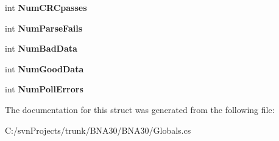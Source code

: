 \begin{DoxyCompactItemize}
\mbox{\label{struct_b_n_a30_1_1_globals2_1_1_polling_stats_aafa0cdda40a8d75c8e2d1b6c0eb58403}} 
int {\bfseries Num\+C\+R\+Cpasses}
\item 
\mbox{\label{struct_b_n_a30_1_1_globals2_1_1_polling_stats_aa584fd8596800896b1934f70bc23167b}} 
int {\bfseries Num\+Parse\+Fails}
\item 
\mbox{\label{struct_b_n_a30_1_1_globals2_1_1_polling_stats_aac4b1091cf97ba96d93d1aa740eb37ca}} 
int {\bfseries Num\+Bad\+Data}
\item 
\mbox{\label{struct_b_n_a30_1_1_globals2_1_1_polling_stats_a82bc57c484213da5a2a00763963d8bf7}} 
int {\bfseries Num\+Good\+Data}
\item 
\mbox{\label{struct_b_n_a30_1_1_globals2_1_1_polling_stats_a5cf15cedd1e382d11ef32b7b212fac5b}} 
int {\bfseries Num\+Poll\+Errors}
\end{DoxyCompactItemize}


The documentation for this struct was generated from the following file\+:\begin{DoxyCompactItemize}
\item 
C\+:/svn\+Projects/trunk/\+B\+N\+A30/\+B\+N\+A30/Globals.\+cs\end{DoxyCompactItemize}
